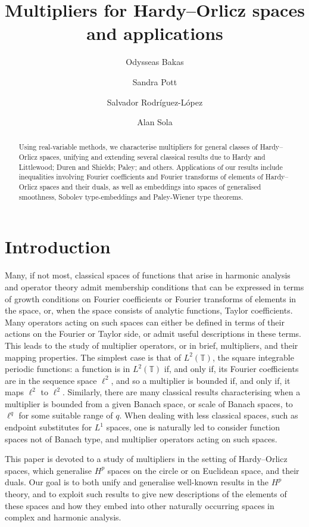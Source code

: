 \documentclass[a4paper, leqno, 10pt]{amsart}
\author[Bakas]{Odysseas Bakas}
\author[Pott]{Sandra Pott}
\author[Rodr\'iguez-L\'opez]{Salvador Rodr\'iguez-L\'opez}
\author[Sola]{Alan Sola}
\numberwithin{equation}{section}
\newcommand{\T}{\mathbb{T}}
\begin{document}
\title[Multipliers for Hardy--Orlicz spaces and applications]{Multipliers for Hardy--Orlicz spaces and applications}

\maketitle
 
%
\begin{abstract} 
Using real-variable methods, we characterise multipliers for general classes of Hardy--Orlicz spaces, %
unifying and extending several classical results due to Hardy and Littlewood; Duren and Shields; Paley; and others.
Applications of our results include inequalities involving Fourier coefficients and Fourier transforms of elements of Hardy--Orlicz spaces and their duals, as well as embeddings into spaces of generalised smoothness, Sobolev type-embeddings and Paley-Wiener type theorems. 
\end{abstract}
 
%
%

\section{Introduction}
Many, if not most, classical spaces of functions that arise in harmonic analysis and operator theory admit membership conditions that can be expressed in terms of growth conditions on %
Fourier coefficients or Fourier transforms of elements in the space, or, when the space consists of analytic functions, Taylor coefficients. Many operators acting on such spaces %
can either be defined in terms of their actions on the Fourier or Taylor side, or admit useful descriptions in these terms. This leads to the study of multiplier operators, or in brief, multipliers, and their mapping properties. The simplest case is that of $L^2(\T)$, the square integrable periodic functions: a function is in $L^2(\T)$ if, and only if, its Fourier coefficients are in the sequence space $\ell^2$, and so a multiplier is bounded if, and only if, it maps $\ell^2$ to $\ell^2$. Similarly, there are many classical results characterising when a multiplier is bounded from a given Banach space, or scale of Banach spaces, to $\ell^q$ for some suitable range of $q$. When dealing with less classical spaces, such as endpoint substitutes for $L^1$ spaces, one is naturally led to consider function spaces not of Banach type, and multiplier operators acting on such spaces. 

This paper is devoted to a study of multipliers in the setting of Hardy--Orlicz spaces, which generalise $H^p$ spaces on the circle or on Euclidean space, and their duals. Our goal is to both unify and generalise well-known results in the $H^p$ theory, and to exploit such results to give new descriptions of the elements of these spaces and how they embed into other naturally occurring spaces in complex and harmonic analysis.
\end{document}
